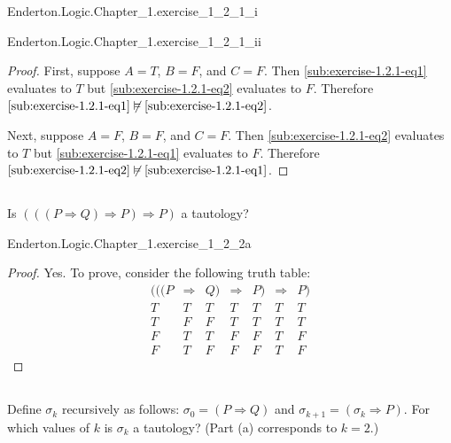\documentclass{report}
\begin{document}
    {Enderton.Logic.Chapter\_1.exercise\_1\_2\_1\_i}

    {Enderton.Logic.Chapter\_1.exercise\_1\_2\_1\_ii}

  \begin{proof}
    First, suppose $A = T$, $B = F$, and $C = F$.
    Then \eqref{sub:exercise-1.2.1-eq1} evaluates to $T$ but
      \eqref{sub:exercise-1.2.1-eq2} evaluates to $F$.
    Therefore $\eqref{sub:exercise-1.2.1-eq1} \not\vDash
      \eqref{sub:exercise-1.2.1-eq2}$.

    Next, suppose $A = F$, $B = F$, and $C = F$.
    Then \eqref{sub:exercise-1.2.1-eq2} evaluates to $T$ but
      \eqref{sub:exercise-1.2.1-eq1} evaluates to $F$.
    Therefore $\eqref{sub:exercise-1.2.1-eq2} \not\vDash
      \eqref{sub:exercise-1.2.1-eq1}$.
  \end{proof}

\subsection{}%

  Is $(((P \Rightarrow Q) \Rightarrow P) \Rightarrow P)$ a tautology?

    {Enderton.Logic.Chapter\_1.exercise\_1\_2\_2a}

  \begin{proof}
    Yes.
    To prove, consider the following truth table:
      $$\begin{array}{s|c|s|c|s|e|s}
        (((P & \Rightarrow & Q) & \Rightarrow & P) & \Rightarrow & P) \\
        \hline
        T & T & T & T & T & T & T \\
        T & F & F & T & T & T & T \\
        F & T & T & F & F & T & F \\
        F & T & F & F & F & T & F
      \end{array}$$
  \end{proof}

\subsection{}%

  Define $\sigma_k$ recursively as follows: $\sigma_0 = (P \Rightarrow Q)$ and
    $\sigma_{k + 1} = (\sigma_k \Rightarrow P)$. For which values of $k$ is
    $\sigma_k$ a tautology? (Part (a) corresponds to $k = 2$.)
\end{document}
